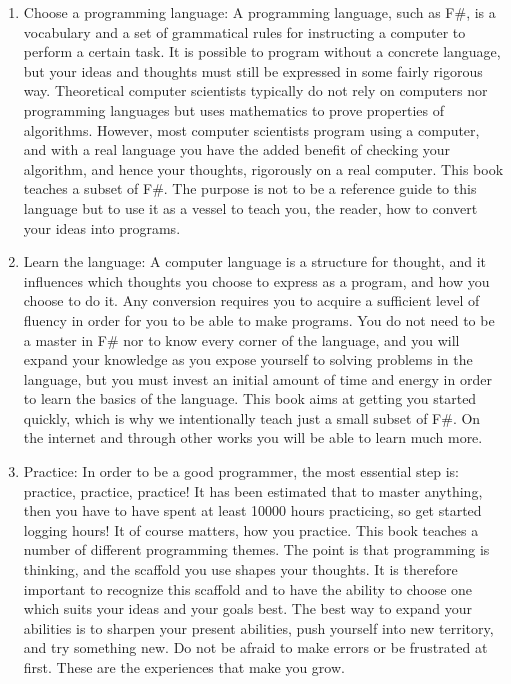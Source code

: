 \documentclass[springer.tex]{subfiles}
\begin{document}
\begin{enumerate}
\item Choose a programming language: A programming language, such as F\#, is a vocabulary and a set of grammatical rules for instructing a computer to perform a certain task. It is possible to program without a concrete language, but your ideas and thoughts must still be expressed in some fairly rigorous way. Theoretical computer scientists typically do not rely on computers nor programming languages but uses mathematics to prove properties of algorithms. However, most computer scientists program using a computer, and with a real language you have the added benefit of checking your algorithm, and hence your thoughts, rigorously on a real computer. This book teaches a subset of F\#. The purpose is not to be a reference guide to this language but to use it as a vessel to teach you, the reader, how to convert your ideas into programs.
\item Learn the language: A computer language is a structure for thought, and it influences which thoughts you choose to express as a program, and how you choose to do it. Any conversion requires you to acquire a sufficient level of fluency in order for you to be able to make programs. You do not need to be a master in F\# nor to know every corner of the language, and you will expand your knowledge as you expose yourself to solving problems in the language, but you must invest an initial amount of time and energy in order to learn the basics of the language. This book aims at getting you started quickly, which is why we intentionally teach just a small subset of F\#. On the internet and through other works you will be able to learn much more.
\item Practice: In order to be a good programmer, the most essential step is: practice, practice, practice! It has been estimated that to master anything, then you have to have spent at least 10000 hours practicing, so get started logging hours! It of course matters, how you practice. This book teaches a number of different programming themes. The point is that programming is thinking, and the scaffold you use shapes your thoughts. It is therefore important to recognize this scaffold and to have the ability to choose one which suits your ideas and your goals best. The best way to expand your abilities is to sharpen your present abilities, push yourself into new territory, and try something new. Do not be afraid to make errors or be frustrated at first. These are the experiences that make you grow.

\end{enumerate}
\end{document}
